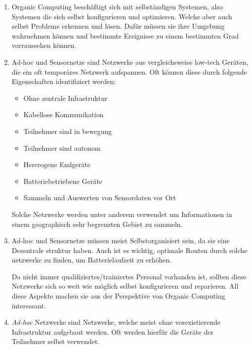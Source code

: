 
\date{Sonntag 10.05.2020}


    \maketitle
    \thispagestyle{fancy}

    \begin{enumerate}[label=\arabic*)]
        \item Organic Computing beschäftigt sich mit selbständigen Systemen, also Systemen die sich selbst konfigurieren und optimieren. Welche aber auch selbst Probleme erkennen und lösen. Dafür müssen sie ihre Umgebung wahrnehmen können und bestimmte Ereignisse zu einem bestimmten Grad vorraussehen können. 

        \item Ad-hoc und Sensornetze sind Netzwerke aus vergleichsweise low-tech Geräten, die ein oft temporäres Netzwerk aufspannen. Oft können diese durch folgende Eigenschaften identifiziert werden:
            \begin{itemize}
                \item Ohne zentrale Infrastruktur
                \item Kabellose Kommunikation
                \item Teilnehmer sind in bewegung
                \item Teilnehmer sind autonom
                \item Hererogene Endgeräte
                \item Batteriebetriebene Geräte
                \item Sammeln und Auswerten von Sensordaten vor Ort
            \end{itemize}
        Solche Netzwerke werden unter anderem verwendet um Informationen in einem geographisch sehr begrenzten Gebiet zu sammeln. 
        
        \item Ad-hoc und Sensornetze müssen meist Selbstorganisiert sein, da sie eine Dezentrale struktur haben. Auch ist es wichtig, optimale Routen durch solche netzwerke zu finden, um Batterielaufzeit zu erhöhen. 
        
        Da nicht immer qualifiziertes/trainiertes Personal vorhanden ist, sollten diese Netzwerke sich so weit wie möglich selbst konfigurieren und reparieren. All diese Aspekte machen sie aus der Perspektive von Organic Computing interessant.
        \item \emph{Ad-hoc} Netzwerke sind Netzwerke, welche meist ohne vorexistierende Infrastruktur aufgebaut werden. Oft werden hierfür die Geräte der Teilnehmer selbst verwendet. 
        

\end{enumerate}
